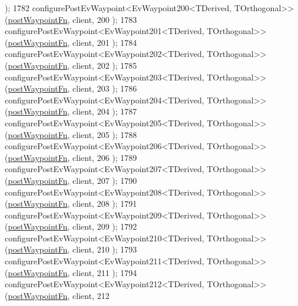 \begin{DoxyCode}
      );
1782     configurePostEvWaypoint<EvWaypoint200<TDerived, TOrthogonal>>(\hyperlink{classcl__move__base__z_1_1WaypointEventDispatcher_a964a57fcce5d48ec60243230722d8dd7}{postWaypointFn}, client, 200
      );
1783     configurePostEvWaypoint<EvWaypoint201<TDerived, TOrthogonal>>(\hyperlink{classcl__move__base__z_1_1WaypointEventDispatcher_a964a57fcce5d48ec60243230722d8dd7}{postWaypointFn}, client, 201
      );
1784     configurePostEvWaypoint<EvWaypoint202<TDerived, TOrthogonal>>(\hyperlink{classcl__move__base__z_1_1WaypointEventDispatcher_a964a57fcce5d48ec60243230722d8dd7}{postWaypointFn}, client, 202
      );
1785     configurePostEvWaypoint<EvWaypoint203<TDerived, TOrthogonal>>(\hyperlink{classcl__move__base__z_1_1WaypointEventDispatcher_a964a57fcce5d48ec60243230722d8dd7}{postWaypointFn}, client, 203
      );
1786     configurePostEvWaypoint<EvWaypoint204<TDerived, TOrthogonal>>(\hyperlink{classcl__move__base__z_1_1WaypointEventDispatcher_a964a57fcce5d48ec60243230722d8dd7}{postWaypointFn}, client, 204
      );
1787     configurePostEvWaypoint<EvWaypoint205<TDerived, TOrthogonal>>(\hyperlink{classcl__move__base__z_1_1WaypointEventDispatcher_a964a57fcce5d48ec60243230722d8dd7}{postWaypointFn}, client, 205
      );
1788     configurePostEvWaypoint<EvWaypoint206<TDerived, TOrthogonal>>(\hyperlink{classcl__move__base__z_1_1WaypointEventDispatcher_a964a57fcce5d48ec60243230722d8dd7}{postWaypointFn}, client, 206
      );
1789     configurePostEvWaypoint<EvWaypoint207<TDerived, TOrthogonal>>(\hyperlink{classcl__move__base__z_1_1WaypointEventDispatcher_a964a57fcce5d48ec60243230722d8dd7}{postWaypointFn}, client, 207
      );
1790     configurePostEvWaypoint<EvWaypoint208<TDerived, TOrthogonal>>(\hyperlink{classcl__move__base__z_1_1WaypointEventDispatcher_a964a57fcce5d48ec60243230722d8dd7}{postWaypointFn}, client, 208
      );
1791     configurePostEvWaypoint<EvWaypoint209<TDerived, TOrthogonal>>(\hyperlink{classcl__move__base__z_1_1WaypointEventDispatcher_a964a57fcce5d48ec60243230722d8dd7}{postWaypointFn}, client, 209
      );
1792     configurePostEvWaypoint<EvWaypoint210<TDerived, TOrthogonal>>(\hyperlink{classcl__move__base__z_1_1WaypointEventDispatcher_a964a57fcce5d48ec60243230722d8dd7}{postWaypointFn}, client, 210
      );
1793     configurePostEvWaypoint<EvWaypoint211<TDerived, TOrthogonal>>(\hyperlink{classcl__move__base__z_1_1WaypointEventDispatcher_a964a57fcce5d48ec60243230722d8dd7}{postWaypointFn}, client, 211
      );
1794     configurePostEvWaypoint<EvWaypoint212<TDerived, TOrthogonal>>(\hyperlink{classcl__move__base__z_1_1WaypointEventDispatcher_a964a57fcce5d48ec60243230722d8dd7}{postWaypointFn}, client, 212

\end{DoxyCode}
